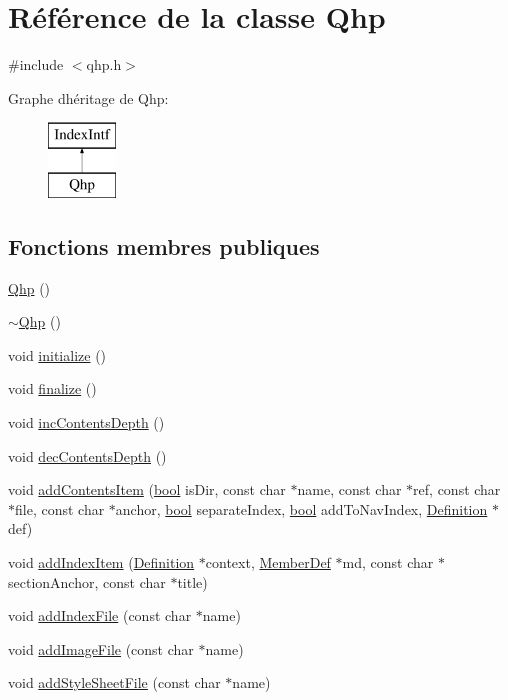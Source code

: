 \hypertarget{class_qhp}{}\section{Référence de la classe Qhp}
\label{class_qhp}


{\ttfamily \#include $<$qhp.\+h$>$}

Graphe d\textquotesingle{}héritage de Qhp\+:\begin{figure}[H]
\begin{center}
\leavevmode
\includegraphics[height=2.000000cm]{class_qhp}
\end{center}
\end{figure}
\subsection*{Fonctions membres publiques}
\begin{DoxyCompactItemize}
\item 
\hyperlink{class_qhp_a1cc5cff0816b9170282a397cf3ab1db4}{Qhp} ()
\item 
\hyperlink{class_qhp_ab10e4a689479c8fd8a51a5563db674d4}{$\sim$\+Qhp} ()
\item 
void \hyperlink{class_qhp_a7ee6480507e32d9142ec04d4e499ae7e}{initialize} ()
\item 
void \hyperlink{class_qhp_a89942e1d21257702167ab30834b991cd}{finalize} ()
\item 
void \hyperlink{class_qhp_a50a0c14cf46a57a63afb304df260da59}{inc\+Contents\+Depth} ()
\item 
void \hyperlink{class_qhp_a7c18564920e18fc9bbdcd8ca6c9b21f0}{dec\+Contents\+Depth} ()
\item 
void \hyperlink{class_qhp_ac8c3cd9a9ea8f8d8204124107e9f4b6d}{add\+Contents\+Item} (\hyperlink{qglobal_8h_a1062901a7428fdd9c7f180f5e01ea056}{bool} is\+Dir, const char $\ast$name, const char $\ast$ref, const char $\ast$file, const char $\ast$anchor, \hyperlink{qglobal_8h_a1062901a7428fdd9c7f180f5e01ea056}{bool} separate\+Index, \hyperlink{qglobal_8h_a1062901a7428fdd9c7f180f5e01ea056}{bool} add\+To\+Nav\+Index, \hyperlink{class_definition}{Definition} $\ast$def)
\item 
void \hyperlink{class_qhp_a9217a4348b84dc5d40c588f7b9cf15d3}{add\+Index\+Item} (\hyperlink{class_definition}{Definition} $\ast$context, \hyperlink{class_member_def}{Member\+Def} $\ast$md, const char $\ast$section\+Anchor, const char $\ast$title)
\item 
void \hyperlink{class_qhp_add8bcd3ac9a548c723a801af39d766f6}{add\+Index\+File} (const char $\ast$name)
\item 
void \hyperlink{class_qhp_a2bbb4b9970a2329b32fe335db286ff87}{add\+Image\+File} (const char $\ast$name)
\item 
void \hyperlink{class_qhp_a67f6d219b09bca247db64fe30454eb52}{add\+Style\+Sheet\+File} (const char $\ast$name)
\end{DoxyCompactItemize}
